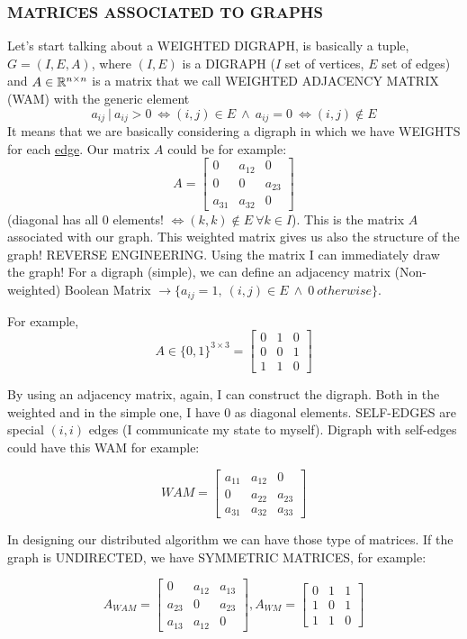 \subsubsection{MATRICES ASSOCIATED TO GRAPHS}
Let's start talking about a WEIGHTED DIGRAPH, is basically a tuple, $G=(I,E,A)$, where $(I,E)$ is a DIGRAPH ($I$ set of vertices, $E$ set of edges) and $A \in \mathbb{R}^{n\times n}$ is a matrix that we call WEIGHTED ADJACENCY MATRIX (WAM) with the generic element
\[
	a_{ij}\ |\ a_{ij} > 0\ \iff (i,j) \in E\ \land\ a_{ij} = 0\ \iff (i,j) \notin E
\]
It means that we are basically considering a digraph in which we have WEIGHTS for each \underline{edge}. Our matrix $A$ could be for example:
\[
	A = \begin{bmatrix}0&a_{12}&0\\0&0&a_{23}\\a_{31}&a_{32}&0\end{bmatrix}
\]
(diagonal has all 0 elements! $\iff (k,k) \notin E\ \forall k \in I$). This is the matrix $A$ associated with our graph. This weighted matrix gives us also the structure of the graph! REVERSE ENGINEERING. Using the matrix I can immediately draw the graph! For a digraph (simple), we can define an adjacency matrix (Non-weighted) Boolean Matrix $\rightarrow \{a_{ij}=1,\ (i,j) \in E\ \land\ 0\ otherwise\}$.

For example,
\[
	A \in \{0,1\}^{3\times 3} = \begin{bmatrix}0&1&0\\0&0&1\\1&1&0\end{bmatrix}
\]

By using an adjacency matrix, again, I can construct the digraph. Both in the weighted and in the simple one, I have 0 as diagonal elements. SELF-EDGES are special $(i,i)$ edges (I communicate my state to myself). Digraph with self-edges could have this WAM for example:

\[
	WAM = \begin{bmatrix}a_{11}&a_{12}&0\\0&a_{22}&a_{23}\\a_{31}&a_{32}&a_{33}\end{bmatrix}
\]

In designing our distributed algorithm we can have those type of matrices.
If the graph is UNDIRECTED, we have SYMMETRIC MATRICES, for example:

\[
	A_{WAM} = \begin{bmatrix}0&a_{12}&a_{13}\\a_{23}&0&a_{23}\\a_{13}&a_{12}&0\end{bmatrix},
	A_{WM} = \begin{bmatrix}0&1&1\\1&0&1\\1&1&0\end{bmatrix}
\]

